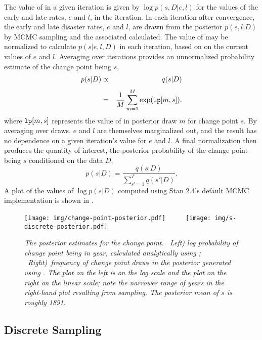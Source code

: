 The value of  in a given iteration is given by $\log
p(s,D|e,l)$ for the values of the early and late rates, $e$ and $l$,
in the iteration.  In each iteration after convergence, the early and
late disaster rates, $e$ and $l$, are drawn from the posterior
$p(e,l|D)$ by MCMC sampling and the associated  calculated.
The value of  may be normalized to calculate $p(s|e,l,D)$ in
each iteration, based on on the current values of $e$ and $l$.
Averaging over iterations provides an unnormalized probability
estimate of the change point being $s$,
%
\begin{eqnarray*}
p(s | D)
& \propto &
q(s | D)
\\[3pt]
& = & 
\frac{1}{M} \sum_{m=1}^{M} \exp({\tt lp}[m,s]).
\end{eqnarray*}
%
where $\mbox{{\tt lp}}[m,s]$ represents the value of  in
posterior draw $m$ for change point $s$.  By averaging over draws,
$e$ and $l$ are themselves marginalized out, and the result has no
dependence on a given iteration's value for $e$ and $l$.  A final
normalization then produces the quantity of interest, the posterior
probability of the change point being $s$ conditioned on the data $D$,
%
\[
p(s | D)
=
\frac{q(s|D)}{\sum_{s'=1}^T q(s' | D)}.
\]
%
A plot of the values of $\log p(s|D)$ computed using Stan 2.4's
default MCMC implementation is shown in
.
%
\begin{figure}
\begin{center}
\texttt{[image: img/change-point-posterior.pdf]}
\ \ \ \ \
\texttt{[image: img/s-discrete-posterior.pdf]}
\end{center}
\vspace*{-12pt}
\caption{\small\it The posterior estimates for the change point.  \
  {\rm Left)} log probability of change point being in year,
  calculated analytically using ; \ {\rm Right)}\ frequency
  of change point draws in the posterior generated using
  \code{lp}. The plot on the left is on the log scale and the plot on
  the right on the linear scale; note the narrower range of years in
  the right-hand plot resulting from sampling. The posterior mean of
  $s$ is roughly 1891.}%
\label{change-point-posterior.figure}
\end{figure}
%



\subsection{Discrete Sampling}

